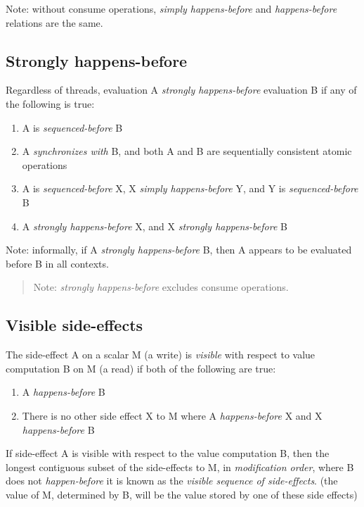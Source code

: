 \documentclass[
]{article}
\begin{document}
Note: without consume operations, \emph{simply happens-before} and
\emph{happens-before} relations are the same.

\hypertarget{strongly-happens-before-1}{%
\subsection{Strongly happens-before}\label{strongly-happens-before-1}}

Regardless of threads, evaluation A \emph{strongly happens-before}
evaluation B if any of the following is true:

\begin{enumerate}
\def\labelenumi{\arabic{enumi})}
\item
  A is \emph{sequenced-before} B
\item
  A \emph{synchronizes with} B, and both A and B are sequentially
  consistent atomic operations
\item
  A is \emph{sequenced-before} X, X \emph{simply happens-before} Y, and
  Y is \emph{sequenced-before} B
\item
  A \emph{strongly happens-before} X, and X \emph{strongly
  happens-before} B
\end{enumerate}

Note: informally, if A \emph{strongly happens-before} B, then A appears
to be evaluated before B in all contexts.

\begin{quote}
Note: \emph{strongly happens-before} excludes consume operations.
\end{quote}

\hypertarget{visible-side-effects}{%
\subsection{Visible side-effects}\label{visible-side-effects}}

The side-effect A on a scalar M (a write) is \emph{visible} with respect
to value computation B on M (a read) if both of the following are true:

\begin{enumerate}
\def\labelenumi{\arabic{enumi})}
\item
  A \emph{happens-before} B
\item
  There is no other side effect X to M where A \emph{happens-before} X
  and X \emph{happens-before} B
\end{enumerate}

If side-effect A is visible with respect to the value computation B,
then the longest contiguous subset of the side-effects to M, in
\emph{modification order}, where B does not \emph{happen-before} it is
known as the \emph{visible sequence of side-effects}. (the value of M,
determined by B, will be the value stored by one of these side effects)
\end{document}
